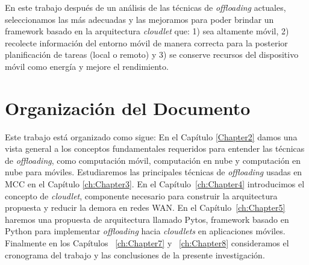 En este trabajo después de un análisis de las técnicas de \emph{offloading} actuales, seleccionamos las más adecuadas y las mejoramos 
para poder brindar un framework basado en la arquitectura \emph{cloudlet} que: 1) sea altamente móvil, 2) recolecte información del entorno móvil 
de manera correcta para la posterior planificación de tareas (local o remoto) y 3) se conserve recursos del dispositivo móvil como energía y mejore 
el rendimiento.  

\section{Organización del Documento}
Este trabajo está organizado como sigue: En el Capítulo \ref{Chapter2} damos una vista general a los conceptos fundamentales requeridos para 
entender las técnicas de \emph{offloading}, como computación móvil, computación en nube y computación en nube para móviles. Estudiaremos las 
principales técnicas de \textit{offloading} usadas en MCC en el Capítulo \ref{ch:Chapter3}. En el Capítulo~\ref{ch:Chapter4} introducimos 
el concepto de \textit{cloudlet}, componente necesario para construir la arquitectura propuesta y reducir la demora en redes WAN.
En el Capítulo~\ref{ch:Chapter5} haremos una propuesta de arquitectura llamado Pytos, framework basado en Python para implementar 
\textit{offloading} hacia \textit{cloudlets} en aplicaciones móviles. Finalmente en los Capítulos ~\ref{ch:Chapter7} y ~\ref{ch:Chapter8} 
consideramos el cronograma del trabajo y las conclusiones de la presente investigación.
